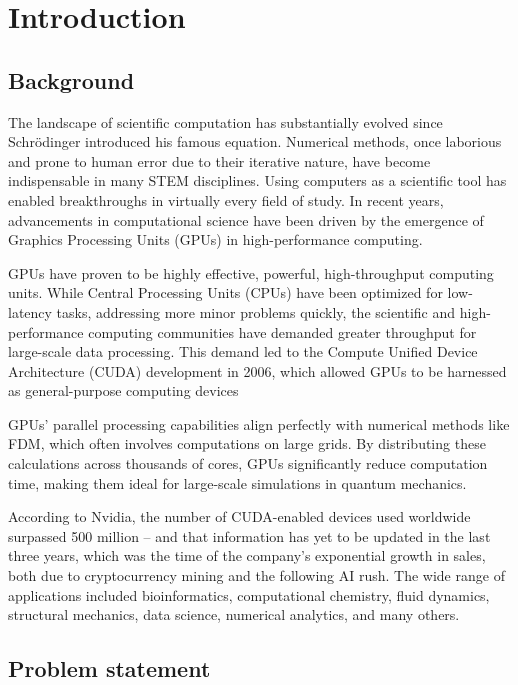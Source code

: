 \section{Introduction}

\subsection{Background}

The landscape of scientific computation has substantially evolved since Schrödinger introduced his famous equation. Numerical methods, once laborious and prone to human error due to their iterative nature, have become indispensable in many STEM disciplines. Using computers as a scientific tool has enabled breakthroughs in virtually every field of study. In recent years, advancements in computational science have been driven by the emergence of Graphics Processing Units (GPUs) in high-performance computing.

GPUs have proven to be highly effective, powerful, high-throughput computing units. While Central Processing Units (CPUs) have been optimized for low-latency tasks, addressing more minor problems quickly, the scientific and high-performance computing communities have demanded greater throughput for large-scale data processing\cite{cheng2014professional}. This demand led to the Compute Unified Device Architecture (CUDA) development in 2006, which allowed GPUs to be harnessed as general-purpose computing devices\cite{cuda}

GPUs' parallel processing capabilities align perfectly with numerical methods like FDM, which often involves computations on large grids. By distributing these calculations across thousands of cores, GPUs significantly reduce computation time, making them ideal for large-scale simulations in quantum mechanics.

According to Nvidia, the number of CUDA-enabled devices used worldwide surpassed 500 million -- and that information has yet to be updated in the last three years, which was the time of the company's exponential growth in sales, both due to cryptocurrency mining and the following AI rush. The wide range of applications included bioinformatics, computational chemistry, fluid dynamics, structural mechanics, data science, numerical analytics, and many others.\cite{cuda} 	

\subsection{Problem statement}

